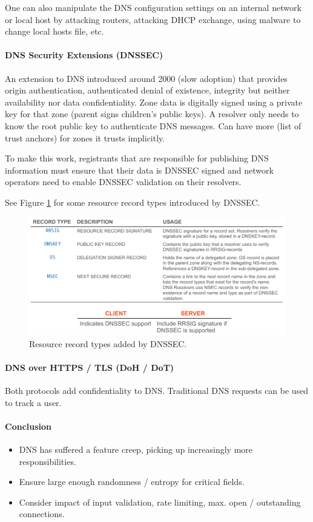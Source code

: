 One can also manipulate the DNS configuration settings on an internal network or local host by attacking routers, attacking DHCP exchange, using malware to change local hosts file, etc.


\paragraph{DNS Security Extensions (DNSSEC)}
An extension to DNS introduced around 2000 (slow adoption) that provides origin authentication, authenticated denial of existence, integrity but neither availability nor data confidentiality. Zone data is digitally signed using a private key for that zone (parent signs children's public keys). A resolver only needs to know the root public key to authenticate DNS messages. Can have more (list of trust anchors) for zones it trusts implicitly.

To make this work, registrants that are responsible for publishing DNS information must ensure that their data is DNSSEC signed and network operators need to enable DNSSEC validation on their resolvers.

See Figure \ref{fig:dnssec} for some resource record types introduced by DNSSEC.

\begin{figure}[h]
	\centering
	\includegraphics[scale=0.8]{images/915-dnssec.PNG}
	\caption{Resource record types added by DNSSEC.}
	\label{fig:dnssec}
\end{figure}


\paragraph{DNS over HTTPS / TLS (DoH / DoT)}
Both protocols add confidentiality to DNS. Traditional DNS requests can be used to track a user. %


\paragraph{Conclusion}
\begin{itemize}
    \item DNS has suffered a feature creep, picking up increasingly more responsibilities.
    \item Ensure large enough randomness / entropy for critical fields.
    \item Consider impact of input validation, rate limiting, max. open / outstanding connections.
\end{itemize}